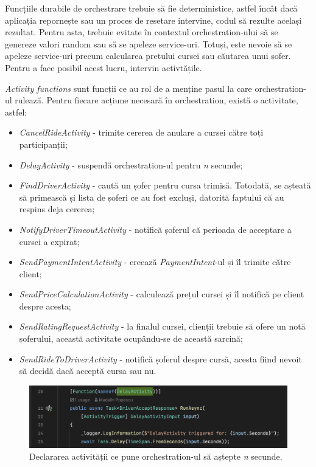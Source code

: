 Funcțiile durabile de orchestrare trebuie să fie deterministice, astfel încât dacă aplicația repornește
sau un proces de resetare intervine, codul să rezulte același rezultat. Pentru asta, trebuie evitate în contextul
orchestration-ului să se genereze valori random sau să se apeleze service-uri. Totuși, este nevoie să se apeleze service-uri precum
calcularea pretului cursei sau căutarea unui șofer. Pentru a face posibil acest lucru, intervin activtățile.

\textit{Activity functions} sunt funcții ce au rol de a menține pasul la care orchestration-ul rulează.
Pentru fiecare acțiune necesară în orchestration, există o activitate, astfel:
\begin{itemize}
    \item \textit{CancelRideActivity} - trimite cererea de anulare a cursei către toți participanții;
    \item \textit{DelayActivity} - suspendă orchestration-ul pentru \textit{n} secunde;
    \item \textit{FindDriverActivity} - caută un șofer pentru cursa trimisă. Totodată, se așteată să primească și lista de șoferi ce au fost excluși, datorită faptului că au respins deja cererea;
    \item \textit{NotifyDriverTimeoutActivity} - notifică șoferul că perioada de acceptare a cursei a expirat;
    \item \textit{SendPaymentIntentActivity} - creează \textit{PaymentIntent}-ul și îl trimite către client;
    \item \textit{SendPriceCalculationActivity} - calculează prețul cursei și îl notifică pe client despre acesta;
    \item \textit{SendRatingRequestActivity} - la finalul cursei, clienții trebuie să ofere un notă șoferului, această activitate ocupându-se de această sarcină;
    \item \textit{SendRideToDriverActivity} - notifică șoferul despre cursă, acesta fiind nevoit să decidă dacă acceptă cursa sau nu.
\end{itemize}

\begin{figure}[H]
    \centering
    \includegraphics[width=15cm]{Assets/activities.png}
    \caption{Declararea activității ce pune orchestration-ul să aștepte \textit{n} secunde.}
    \label{fig:activities}
\end{figure}

